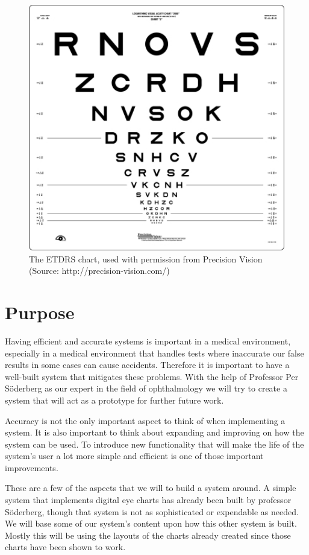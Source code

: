 \documentclass[12pt,a4paper,notitlepage]{report}
\begin{document}
\begin{figure}[ht!]
\centering
\includegraphics[width=120mm]{images/etdrs_chart.jpg}
\caption{The ETDRS chart, used with permission from Precision Vision \\ (Source: http://precision-vision.com/)\label{fig:etdrs_chart1}}
\end{figure} 

\section{Purpose}
Having efficient and accurate systems is important in a medical environment, especially in a medical environment that handles tests where inaccurate our false results in some cases can cause accidents. Therefore it is important to have a well-built system that mitigates these problems. With the help of Professor Per Söderberg as our expert in the field of ophthalmology we will try to create a system that will act as a prototype for further future work. 

Accuracy is not the only important aspect to think of when implementing a system. It is also important to think about expanding and improving on how the system can be used. To introduce new functionality that will make the life of the system's user a lot more simple and efficient is one of those important improvements. 

These are a few of the aspects that we will to build a system around. A simple system that implements digital eye charts has already been built by professor Söderberg, though that system is not as sophisticated or expendable as needed. We will base some of our system's content upon how this other system is built. Mostly this will be using the layouts of the charts already created since those charts have been shown to work. 
\end{document}
